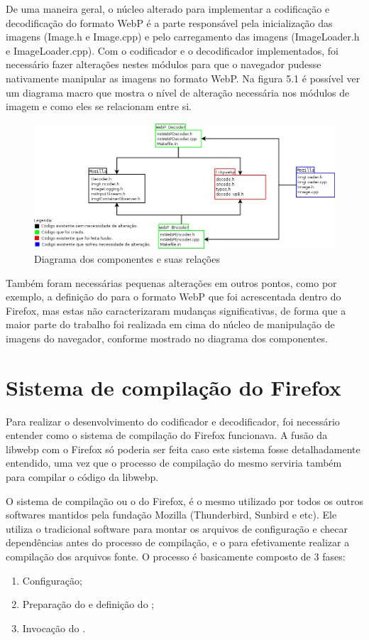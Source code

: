 \documentclass[espaco=simples,appendix=Name]{abnt}
\begin{document}
De uma maneira geral, o núcleo alterado para implementar a codificação e decodificação do formato WebP é a parte responsável pela inicialização das imagens (Image.h e Image.cpp) e pelo carregamento das imagens (ImageLoader.h e ImageLoader.cpp). Com o codificador e o decodificador implementados, foi necessário fazer alterações nestes módulos para que o navegador pudesse nativamente manipular as imagens no formato WebP. Na figura 5.1 é possível ver um diagrama macro que mostra o nível de alteração necessária nos módulos de imagem e como eles se relacionam entre si.

\begin{figure}[h]
  \centering
    \includegraphics[scale=0.45]{Arquitetura.png}
  \caption{Diagrama dos componentes e suas relações}
\end{figure}

Também foram necessárias pequenas alterações em outros pontos, como por exemplo, a definição do  para o formato WebP que foi acrescentada dentro do Firefox, mas estas não caracterizaram mudanças significativas, de forma que a maior parte do trabalho foi realizada em cima do núcleo de manipulação de imagens do navegador, conforme mostrado no diagrama dos componentes.

\section{Sistema de compilação do Firefox}

Para realizar o desenvolvimento do codificador e decodificador, foi necessário entender como o sistema de compilação do Firefox funcionava. A fusão da libwebp com o Firefox só poderia ser feita caso este sistema fosse detalhadamente entendido, uma vez que o processo de compilação do mesmo serviria também para compilar o código da libwebp.

O sistema de compilação ou o  do Firefox, é o mesmo utilizado por todos os outros softwares mantidos pela fundação Mozilla (Thunderbird, Sunbird e etc). Ele utiliza o tradicional software  para montar os arquivos de configuração e checar dependências antes do processo de compilação, e o  para efetivamente realizar a compilação dos arquivos fonte. O processo é basicamente composto de 3 fases:
\begin{enumerate}
        \item Configuração;
        \item Preparação do  e definição do ;
        \item Invocação do .
\end{enumerate}
\end{document}
